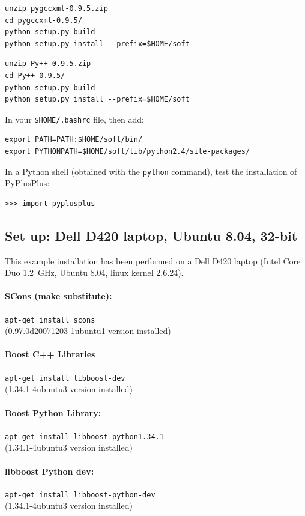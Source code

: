 \documentclass[12pt,a4paper]{article}
\begin{document}
\begin{verbatim}
unzip pygccxml-0.9.5.zip
cd pygccxml-0.9.5/
python setup.py build
python setup.py install --prefix=$HOME/soft
\end{verbatim}

\begin{verbatim}
unzip Py++-0.9.5.zip 
cd Py++-0.9.5/
python setup.py build
python setup.py install --prefix=$HOME/soft
\end{verbatim}

In your {\tt \$HOME/.bashrc} file, then add:
\begin{verbatim}
export PATH=PATH:$HOME/soft/bin/
export PYTHONPATH=$HOME/soft/lib/python2.4/site-packages/
\end{verbatim}

In a Python shell (obtained with the {\tt python} command), test the installation
of PyPlusPlus:
\begin{verbatim}
>>> import pyplusplus
\end{verbatim}

\subsection{Set up: Dell D420 laptop, Ubuntu 8.04, 32-bit}
This example installation has been performed on a Dell D420 laptop (Intel
Core Duo 1.2~GHz, Ubuntu 8.04, linux kernel 2.6.24).

\paragraph{SCons (make substitute):} {\tt apt-get install scons} \\
(0.97.0d20071203-1ubuntu1 version installed)

\paragraph{Boost C++ Libraries} {\tt apt-get install libboost-dev} \\
(1.34.1-4ubuntu3 version installed)

\paragraph{Boost Python Library:} {\tt apt-get install libboost-python1.34.1} \\
(1.34.1-4ubuntu3 version installed)

\paragraph{libboost Python dev:} {\tt apt-get install libboost-python-dev} \\
(1.34.1-4ubuntu3 version installed)
\end{document}
